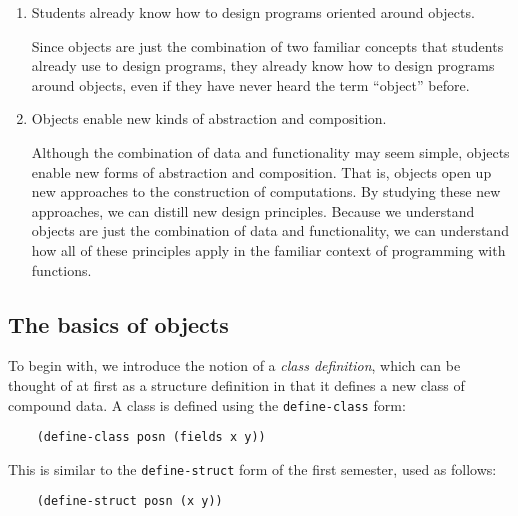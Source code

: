 \documentclass[submission,copyright]{eptcs}
\begin{document}
\begin{enumerate}

\item Students already know how to design programs oriented around objects.

Since objects are just the combination of two familiar concepts that
students already use to design programs, they already know how to
design programs around objects, even if they have never heard the term
``object'' before.

\item Objects enable new kinds of abstraction and composition.

Although the combination of data and functionality may seem simple,
objects enable new forms of abstraction and composition. That is,
objects open up new approaches to the construction of computations. By
studying these new approaches, we can distill new design
principles. Because we understand objects are just the combination of
data and functionality, we can understand how all of these principles
apply in the familiar context of programming with functions. 
\end{enumerate}

\subsection{The basics of objects}

To begin with, we introduce the notion of a \emph{class definition},
which can be thought of at first as a structure definition in that
it defines a new class of compound data.  A class is defined using the
{\tt define-class} form:
\begin{verbatim}
    (define-class posn (fields x y))
\end{verbatim}
This is similar to the {\tt define-struct} form of the first semester,
used as follows:
\begin{verbatim}
    (define-struct posn (x y))
\end{verbatim}
\end{document}
